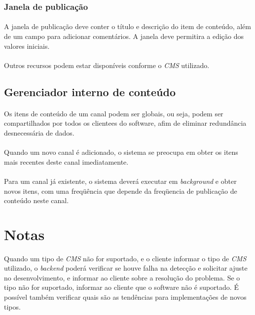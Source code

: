 \documentclass[a4paper,12pt]{article}
\def\cms{\emph{CMS}}
\begin{document}
\subsubsection{Janela de publicação}

\paragraph{}
A janela de publicação deve conter o título e descrição do item de conteúdo,
além de um campo para adicionar comentários. A janela deve permitira a edição
dos valores iniciais.

\paragraph{}
Outros recursos podem estar disponíveis conforme o \cms{} utilizado.

\subsection{Gerenciador interno de conteúdo}

\paragraph{}
Os itens de conteúdo de um canal podem ser globais, ou seja, podem ser
compartilhados por todos os clientees do software, afim de eliminar redundância
desnecessária de dados.

\paragraph{}
Quando um novo canal é adicionado, o sistema se preocupa em obter os itens mais
recentes deste canal imediatamente.

\paragraph{}
Para um canal já existente, o sistema deverá executar em \emph{background} e
obter novos itens, com uma freqüência que depende da freqüencia de publicação
de conteúdo neste canal.



\appendix

\section{Notas}

\paragraph{}
Quando um tipo de \cms{} não for suportado, e o cliente informar o tipo de
\cms{} utilizado, o \emph{backend} poderá verificar se houve falha na detecção
e solicitar ajuste no desenvolvimento, e informar ao cliente sobre a resolução
do problema. Se o tipo não for suportado, informar ao cliente que o software
não é suportado. É possível também verificar quais são as tendências para
implementações de novos tipos.
\end{document}
